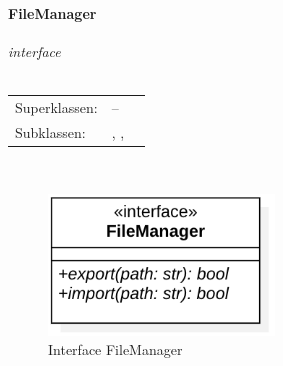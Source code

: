 \documentclass{article}
\newcommand{\classheader}[2][]{\paragraph{#2}
\mbox{}\textit{#1}\\\\}
\newcommand{\classref}[1]{\texttt{\nameref{cls:#1}}}
\begin{document}
\newpage
\classheader[\flqq{}interface\frqq]{FileManager}\label{cls:FileManager}
\begin{tabular}{lll}
 Superklassen: & --\\
 Subklassen: & \classref{ProjectManager} , \classref{FunctionController}, \classref{EvaluationController}
\end{tabular}\\

\begin{figure}[H]%
    \centering
    \includegraphics[width=6cm]{entwurf/Floriane/FileManager.png}
    \caption{Interface FileManager}
\end{figure}
\end{document}
